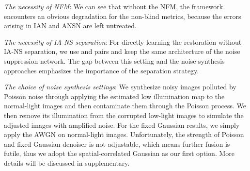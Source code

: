 \documentclass[10pt,twocolumn,letterpaper]{article}
\begin{document}
\noindent \emph{The necessity of NFM}: We can see that without the NFM, the framework encounters an obvious degradation for the non-blind metrics, because the errors arising in IAN and ANSN are left untreated. 

\noindent \emph{The necessity of IA-NS separation}: For directly learning the restoration without IA-NS separation, we use  and  pairs and keep the same architecture of the noise suppression network. The gap between this setting and the noise synthesis approaches emphasizes the importance of the separation strategy.

\noindent \emph{The choice of noise synthesis settings}: We synthesize noisy images polluted by Poisson noise through applying the estimated low illumination map to the normal-light images and then contaminate them through the Poisson process. We then remove its illumination from the corrupted low-light images to simulate the adjusted images with amplified noise. For the fixed Gaussian results, we simply apply the AWGN on normal-light images. Unfortunately, the strength of Poisson and fixed-Gaussian denoiser is not adjustable, which means further fusion is futile, thus we adopt the spatial-correlated Gaussian as our first option. More details will be discussed in supplementary. 




\begin{table}[t]
  \caption{Ablation study on different configurations. }\label{tab:ablation}
    \centering
    \vspace{-10pt}
\end{table}
\end{document}
